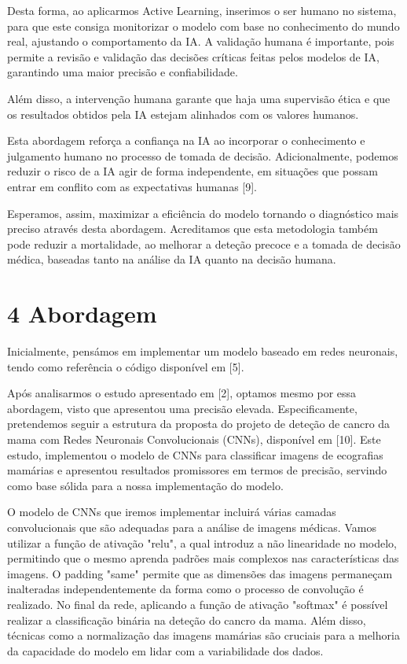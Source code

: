 \documentclass[10pt]{article}
\begin{document}
Desta forma, ao aplicarmos Active Learning, inserimos o ser humano no sistema, para que este consiga monitorizar o modelo com base no conhecimento do mundo real, ajustando o comportamento da IA. A validação humana é importante, pois permite a revisão e validação das decisões críticas feitas pelos modelos de IA, garantindo uma maior precisão e confiabilidade.

Além disso, a intervenção humana garante que haja uma supervisão ética e que os resultados obtidos pela IA estejam alinhados com os valores humanos.

Esta abordagem reforça a confiança na IA ao incorporar o conhecimento e julgamento humano no processo de tomada de decisão. Adicionalmente, podemos reduzir o risco de a IA agir de forma independente, em situações que possam entrar em conflito com as expectativas humanas [9].

Esperamos, assim, maximizar a eficiência do modelo tornando o diagnóstico mais preciso através desta abordagem. Acreditamos que esta metodologia também pode reduzir a mortalidade, ao melhorar a deteção precoce e a tomada de decisão médica, baseadas tanto na análise da IA quanto na decisão humana.

\section*{4 Abordagem}
Inicialmente, pensámos em implementar um modelo baseado em redes neuronais, tendo como referência o código disponível em [5].

Após analisarmos o estudo apresentado em [2], optamos mesmo por essa abordagem, visto que apresentou uma precisão elevada. Especificamente, pretendemos seguir a estrutura da proposta do projeto de deteção de cancro da mama com Redes Neuronais Convolucionais (CNNs), disponível em [10]. Este estudo, implementou o modelo de CNNs para classificar imagens de ecografias mamárias e apresentou resultados promissores em termos de precisão, servindo como base sólida para a nossa implementação do modelo.

O modelo de CNNs que iremos implementar incluirá várias camadas convolucionais que são adequadas para a análise de imagens médicas. Vamos utilizar a função de ativação "relu", a qual introduz a não linearidade no modelo, permitindo que o mesmo aprenda padrões mais complexos nas características das imagens. O padding "same" permite que as dimensões das imagens permaneçam inalteradas independentemente da forma como o processo de convolução é realizado. No final da rede, aplicando a função de ativação "softmax" é possível realizar a classificação binária na deteção do cancro da mama. Além disso, técnicas como a normalização das imagens mamárias são cruciais para a melhoria da capacidade do modelo em lidar com a variabilidade dos dados.
\end{document}
